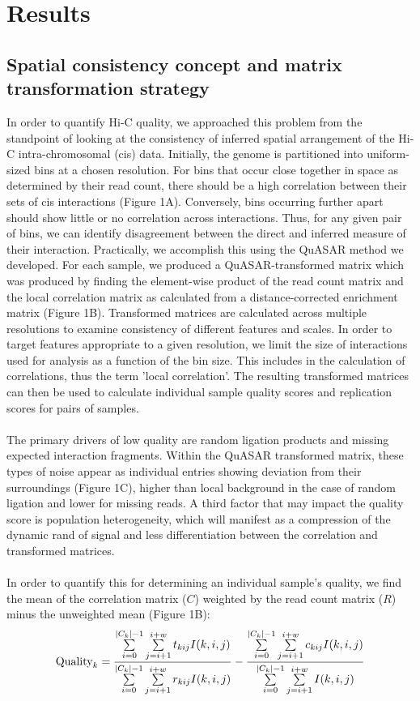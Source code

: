 \section{Results}
\subsection{Spatial consistency concept and matrix transformation strategy}

In order to quantify Hi-C quality, we approached this problem from the standpoint of looking at the consistency of inferred spatial arrangement of the Hi-C intra-chromosomal (cis) data. Initially, the genome is partitioned into uniform-sized bins at a chosen resolution. For bins that occur close together in space as determined by their read count, there should be a high correlation between their sets of cis interactions (Figure 1A). Conversely, bins occurring further apart should show little or no correlation across interactions. Thus, for any given pair of bins, we can identify disagreement between the direct and inferred measure of their interaction. Practically, we accomplish this using the QuASAR method we developed. For each sample, we produced a QuASAR-transformed matrix which was produced by finding the element-wise product of the read count matrix and the local correlation matrix as calculated from a distance-corrected enrichment matrix (Figure 1B). Transformed matrices are calculated across multiple resolutions to examine consistency of different features and scales. In order to target features appropriate to a given resolution, we limit the size of interactions used for analysis as a function of the bin size. This includes in the calculation of correlations, thus the term 'local correlation'. The resulting transformed matrices can then be used to calculate individual sample quality scores and replication scores for pairs of samples.
\\\\
The primary drivers of low quality are random ligation products and missing expected interaction fragments. Within the QuASAR transformed matrix, these types of noise appear as individual entries showing deviation from their surroundings (Figure 1C), higher than local background in the case of random ligation and lower for missing reads. A third factor that may impact the quality score is population heterogeneity, which will manifest as a compression of the dynamic rand of signal and less differentiation between the correlation and transformed matrices.
\\\\
In order to quantify this for determining an individual sample's quality, we find the mean of the correlation matrix ($C$) weighted by the read count matrix ($R$) minus the unweighted mean (Figure 1B):
\[\textnormal{Quality}_{k}=\frac{\sum\limits_{i=0}^{|C_k|-1}\sum\limits_{j=i+1}^{i+w}t_{kij}I(k,i,j)}{\sum\limits_{i=0}^{|C_k|-1}\sum\limits_{j=i+1}^{i+w}r_{kij}I(k,i,j)}-\frac{\sum\limits_{i=0}^{|C_k|-1}\sum\limits_{j=i+1}^{i+w}c_{kij}I(k,i,j)}{\sum\limits_{i=0}^{|C_k|-1}\sum\limits_{j=i+1}^{i+w}I(k,i,j)}\]

